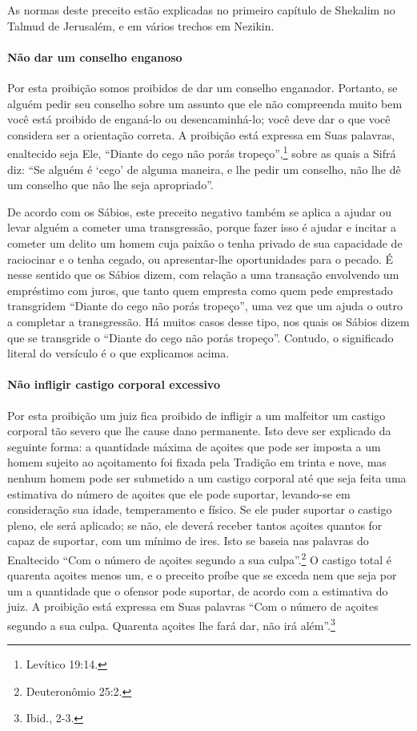 As normas deste preceito estão explicadas no primeiro capítulo de
Shekalim no Talmud de Jerusalém, e em vários trechos em Nezikin.

\paragraph{Não dar um conselho enganoso}

Por esta proibição somos proibidos de dar um conselho enganador.
Portanto, se alguém pedir seu conselho sobre um assunto que ele não
compreenda muito bem você está proibido de enganá-lo ou desencaminhá-lo;
você deve dar o que você considera ser a orientação correta. A proibição
está expressa em Suas palavras, enaltecido seja Ele, ``Diante do cego
não porás tropeço'',\footnote{Levítico 19:14.} sobre as quais a Sifrá diz: ``Se
alguém é `cego' de alguma maneira, e lhe pedir um conselho, não lhe dê
um conselho que não lhe seja apropriado''.

De acordo com os Sábios, este preceito negativo também se aplica a
ajudar ou levar alguém a cometer uma transgressão, porque fazer isso é
ajudar e incitar a cometer um delito um homem cuja paixão o tenha
privado de sua capacidade de raciocinar e o tenha cegado, ou
apresentar-lhe oportunidades para o pecado. É nesse sentido que os
Sábios dizem, com relação a uma transação envolvendo um empréstimo com
juros, que tanto quem empresta como quem pede emprestado transgridem
``Diante do cego não porás tropeço'', uma vez que um ajuda o outro a
completar a transgressão. Há muitos casos desse tipo, nos quais os
Sábios dizem que se transgride o ``Diante do cego não porás tropeço''.
Contudo, o significado literal do versículo é o que explicamos acima.

\paragraph{Não infligir castigo corporal excessivo}

Por esta proibição um juiz fica proibido de infligir a um malfeitor um
castigo corporal tão severo que lhe cause dano permanente. Isto deve ser
explicado da seguinte forma: a quantidade máxima de açoites que pode ser
imposta a um homem sujeito ao açoitamento foi fixada pela Tradição em
trinta e nove, mas nenhum homem pode ser submetido a um castigo corporal
até que seja feita uma estimativa do número de açoites que ele pode
suportar, levando-se em consideração sua idade, temperamento e físico.
Se ele puder suportar o castigo pleno, ele será aplicado; se não, ele
deverá receber tantos açoites quantos for capaz de suportar, com um mínimo de
ires. Isto se baseia nas palavras do Enaltecido ``Com o número de açoites segundo a
sua culpa''.\footnote{Deuteronômio 25:2.} O castigo total é quarenta açoites
menos um, e o preceito proíbe que se exceda nem que seja por um a
quantidade que o ofensor pode suportar, de acordo com a estimativa do
juiz. A proibição está expressa em Suas palavras ``Com o número de
açoites segundo a sua culpa. Quarenta açoites lhe fará dar, não irá
além''.\footnote{Ibid., 2-3.}

